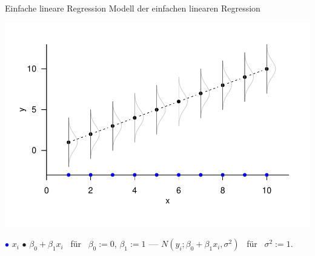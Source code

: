 \documentclass[
  8pt,
  ignorenonframetext,
]{beamer}
\begin{document}
\begin{frame}{Einfache lineare Regression}
\protect\hypertarget{einfache-lineare-regression-4}{}
Modell der einfachen linearen Regression \vspace{1mm} 

\begin{center}\includegraphics[width=0.85\linewidth]{1_Abbildungen/alm_1_elr_1} \end{center}
\vspace{-4mm}
\footnotesize
\center

\textcolor{blue}{$\bullet$} \(x_i\) \hspace{2mm} \(\bullet\)
\(\beta_0 + \beta_1x_i\) \mbox{ für } \(\beta_0 := 0\), \(\beta_1 := 1\)
\hspace{2mm} \textcolor{gray}{\textbf{---}}
\(N(y_i; \beta_0 + \beta_1x_i, \sigma^2)\) \mbox{ für }
\(\sigma^2 := 1\).
\end{frame}
\end{document}
